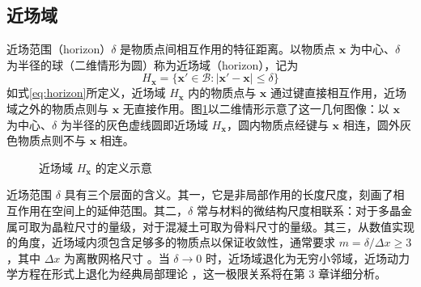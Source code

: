 \subsection{近场域}

近场范围（horizon）$\delta$ 是物质点间相互作用的特征距离。以物质点 $\mathbf{x}$ 为中心、$\delta$ 为半径的球（二维情形为圆）称为近场域（horizon），记为
\begin{equation}
  H_{\mathbf{x}}=\{\mathbf{x}'\in\mathcal{B}:|\mathbf{x}'-\mathbf{x}|\le\delta\}
  \label{eq:horizon}
\end{equation}
如式\eqref{eq:horizon}所定义，近场域 $H_{\mathbf{x}}$ 内的物质点与 $\mathbf{x}$ 通过键直接相互作用，近场域之外的物质点则与 $\mathbf{x}$ 无直接作用。图\ref{fig:horizon-definition}以二维情形示意了这一几何图像：以 $\mathbf{x}$ 为中心、$\delta$ 为半径的灰色虚线圆即近场域 $H_{\mathbf{x}}$，圆内物质点经键与 $\mathbf{x}$ 相连，圆外灰色物质点则不与 $\mathbf{x}$ 相连。

\begin{figure}[htbp]
  \centering
  \caption{近场域 $H_{\mathbf{x}}$ 的定义示意}
  \label{fig:horizon-definition}
\end{figure}

近场范围 $\delta$ 具有三个层面的含义。其一，它是非局部作用的长度尺度，刻画了相互作用在空间上的延伸范围。其二，$\delta$ 常与材料的微结构尺度相联系：对于多晶金属可取为晶粒尺寸的量级，对于混凝土可取为骨料尺寸的量级。其三，从数值实现的角度，近场域内须包含足够多的物质点以保证收敛性，通常要求 $m=\delta/\Delta x\ge 3$，其中 $\Delta x$ 为离散网格尺寸 \cite{Bobaru2009}。当 $\delta\to 0$ 时，近场域退化为无穷小邻域，近场动力学方程在形式上退化为经典局部理论 \cite{SillingLehoucq2008}，这一极限关系将在第 3 章详细分析。

